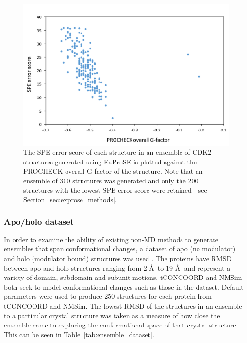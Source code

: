 \begin{figure}
\centering

\includegraphics[width=\textwidth]{figures/score_procheck/score_procheck}

\caption[SPE error score plotted against PROCHECK overall G-factor for an ExProSE ensemble]
{The SPE error score of each structure in an ensemble of CDK2 structures generated using ExProSE is plotted against the PROCHECK overall G-factor of the structure.
Note that an ensemble of 300 structures was generated and only the 200 structures with the lowest SPE error score were retained - see Section~\ref{sec:exprose_methods}.}

\label{fig:score_procheck}
\end{figure}


\subsubsection{Apo/holo dataset}

In order to examine the ability of existing non-MD methods to generate ensembles that span conformational changes, a dataset of apo (no modulator) and holo (modulator bound) structures was used \cite{Atilgan2010}.
The proteins have RMSD between apo and holo structures ranging from 2 \AA\ to 19 \AA, and represent a variety of domain, subdomain and subunit motions.
tCONCOORD \cite{Seeliger2007} and NMSim \cite{Kruger2012} both seek to model conformational changes such as those in the dataset.
Default parameters were used to produce 250 structures for each protein from tCONCOORD and NMSim.
The lowest RMSD of the structures in an ensemble to a particular crystal structure was taken as a measure of how close the ensemble came to exploring the conformational space of that crystal structure.
This can be seen in Table~\ref{tab:ensemble_dataset}.

